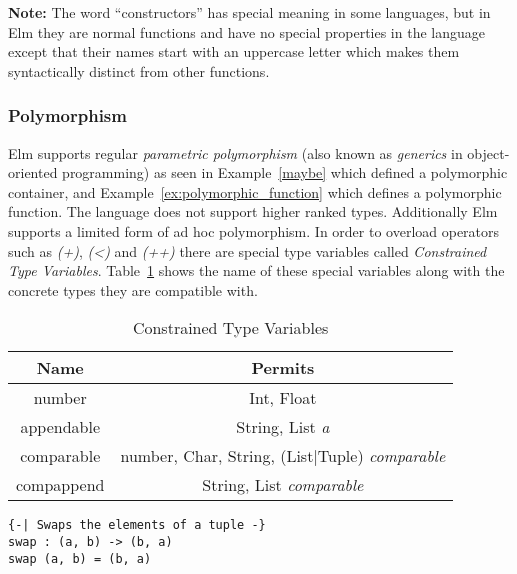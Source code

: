 \documentclass[../thesis.tex]{subfiles}
\begin{document}
\textbf{Note:}
The word ``constructors'' has special meaning in some languages, but in Elm they
are normal functions and have no special properties in the language
except that their names start with an uppercase letter which makes them syntactically distinct
from other functions.

\subsubsection{Polymorphism}
Elm supports regular \textit{parametric polymorphism} (also known as \textit{generics} in object-oriented programming)
as seen in Example~\ref{maybe} which defined a polymorphic container, and Example~\ref{ex:polymorphic_function}
which defines a polymorphic function.
The language does not support higher ranked types.
Additionally Elm supports a limited form of ad hoc polymorphism.
In order to overload operators such as \textit{(+)}, \textit{(<)} and \textit{(++)}
there are special type variables called \textit{Constrained Type Variables}.
Table~\ref{tab:ctv} shows the name of these special variables along with the
concrete types they are compatible with.
\begin{table}[htpb]
    \centering
    \label{tab:ctv}
    \begin{tabular}{c|c}
        Name & Permits \\
        \hline
        number & Int, Float \\
        appendable & String, List \textit{a} \\
        comparable & number, Char, String, (List|Tuple) \textit{comparable} \\
        compappend & String, List \textit{comparable} \\
    \end{tabular}
    \caption{Constrained Type Variables}
\end{table}
\begin{example}\label{ex:polymorphic_function}
\begin{verbatim}
{-| Swaps the elements of a tuple -}
swap : (a, b) -> (b, a)
swap (a, b) = (b, a)
\end{verbatim}
\end{example}
\end{document}
